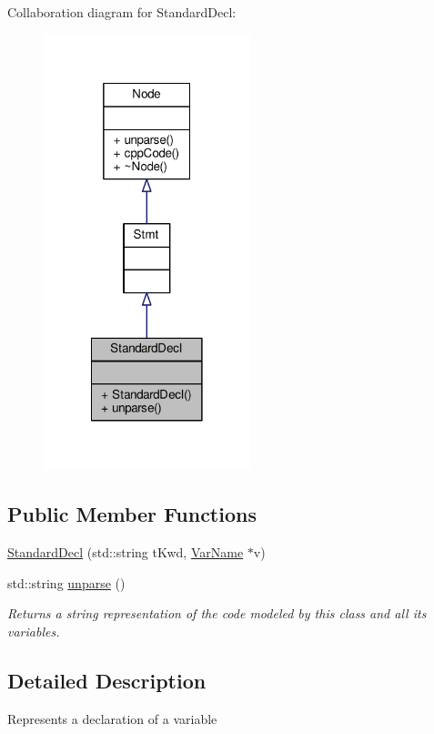 Collaboration diagram for Standard\-Decl\-:\nopagebreak
\begin{figure}[H]
\begin{center}
\leavevmode
\includegraphics[width=170pt]{classStandardDecl__coll__graph}
\end{center}
\end{figure}
\subsection*{Public Member Functions}
\begin{DoxyCompactItemize}
\item 
\hyperlink{classStandardDecl_ae31e5b6e6c375afee8178d1715c80053}{Standard\-Decl} (std\-::string t\-Kwd, \hyperlink{classVarName}{Var\-Name} $\ast$v)
\item 
std\-::string \hyperlink{classStandardDecl_a3ee30dee2f990e66c795a1fb77fe0117}{unparse} ()
\begin{DoxyCompactList}\small\item\em Returns a string representation of the code modeled by this class and all its variables. \end{DoxyCompactList}\end{DoxyCompactItemize}


\subsection{Detailed Description}
Represents a declaration of a variable \par
 

